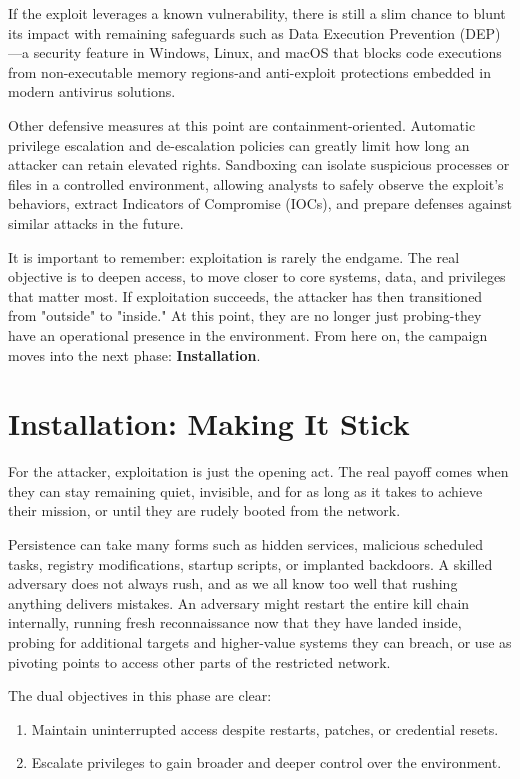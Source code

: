 If the exploit leverages a known vulnerability, there is still a slim chance to blunt its impact with remaining safeguards such as Data Execution Prevention (DEP)—a security feature in Windows, Linux, and macOS that blocks code executions from non-executable memory regions-and anti-exploit protections embedded in modern antivirus solutions.

Other defensive measures at this point are containment-oriented. Automatic privilege escalation and de-escalation policies can greatly limit how long an attacker can retain elevated rights. Sandboxing can isolate suspicious processes or files in a controlled environment, allowing analysts to safely observe the exploit's behaviors, extract Indicators of Compromise (IOCs), and prepare defenses against similar attacks in the future.

It is important to remember: exploitation is rarely the endgame. The real objective is to deepen access, to move closer to core systems, data, and privileges that matter most. If exploitation succeeds, the attacker has then transitioned from "outside" to "inside." At this point, they are no longer just probing-they have an operational presence in the environment. From here on, the campaign moves into the next phase: \textbf{Installation}.

\section{Installation: Making It Stick}
For the attacker, exploitation is just the opening act. The real payoff comes when they can stay remaining quiet, invisible, and for as long as it takes to achieve their mission, or until they are rudely booted from the network.

Persistence can take many forms such as hidden services, malicious scheduled tasks, registry modifications, startup scripts, or implanted backdoors. A skilled adversary does not always rush, and as we all know too well that rushing anything delivers mistakes. An adversary might restart the entire kill chain internally, running fresh reconnaissance now that they have landed inside, probing for additional targets and higher-value systems they can breach, or use as pivoting points to access other parts of the restricted network.

The dual objectives in this phase are clear:
\begin{enumerate}
    \item Maintain uninterrupted access despite restarts, patches, or credential resets.
    \item Escalate privileges to gain broader and deeper control over the environment.
\end{enumerate}

